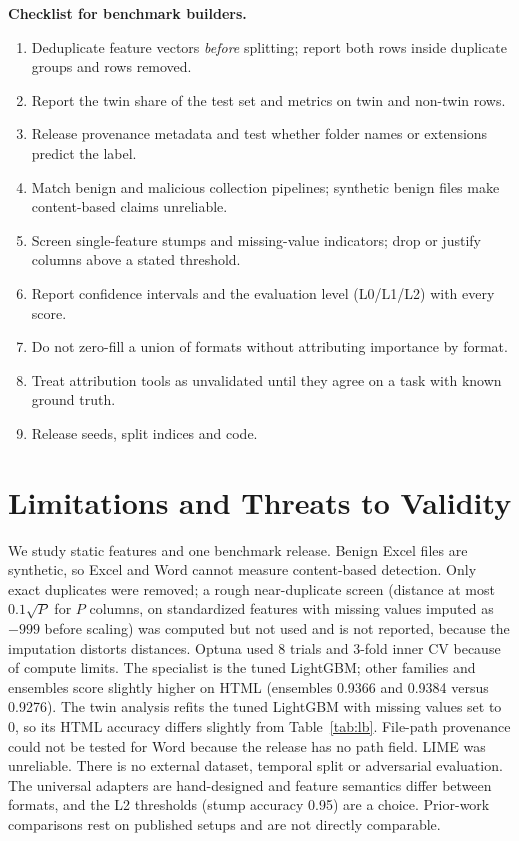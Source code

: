 \documentclass[conference]{IEEEtran}
\begin{document}
\textbf{Checklist for benchmark builders.}
\begin{enumerate}
\item Deduplicate feature vectors \emph{before} splitting; report both rows inside duplicate groups and rows removed.
\item Report the twin share of the test set and metrics on twin and non-twin rows.
\item Release provenance metadata and test whether folder names or extensions predict the label.
\item Match benign and malicious collection pipelines; synthetic benign files make content-based claims unreliable.
\item Screen single-feature stumps and missing-value indicators; drop or justify columns above a stated threshold.
\item Report confidence intervals and the evaluation level (L0/L1/L2) with every score.
\item Do not zero-fill a union of formats without attributing importance by format.
\item Treat attribution tools as unvalidated until they agree on a task with known ground truth.
\item Release seeds, split indices and code.
\end{enumerate}

\section{Limitations and Threats to Validity}
We study static features and one benchmark release. Benign Excel files are synthetic, so Excel and Word cannot measure content-based detection. Only exact duplicates were removed; a rough near-duplicate screen (distance at most $0.1\sqrt{P}$ for $P$ columns, on standardized features with missing values imputed as $-999$ before scaling) was computed but not used and is not reported, because the imputation distorts distances. Optuna used 8 trials and 3-fold inner CV because of compute limits. The specialist is the tuned LightGBM; other families and ensembles score slightly higher on HTML (ensembles 0.9366 and 0.9384 versus 0.9276). The twin analysis refits the tuned LightGBM with missing values set to 0, so its HTML accuracy differs slightly from Table~\ref{tab:lb}. File-path provenance could not be tested for Word because the release has no path field. LIME was unreliable. There is no external dataset, temporal split or adversarial evaluation. The universal adapters are hand-designed and feature semantics differ between formats, and the L2 thresholds (stump accuracy 0.95) are a choice. Prior-work comparisons rest on published setups and are not directly comparable.
\end{document}
